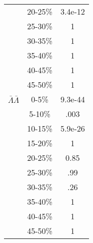 \begin{table}
\begin{minipage}{18pc}
\begin{center}
\begin{tabular}{| c | c | c |}
   & 20-25\% & 3.4e-12 \\
   & 25-30\% & 1 \\
   & 30-35\% & 1 \\
   & 35-40\% & 1 \\
   & 40-45\% & 1 \\
   & 45-50\% & 1 \\
   \hline
  $\bar{\Lambda}\bar{\Lambda}$ &  0-5\% & 9.3e-44 \\
   & 5-10\% & .003 \\
   & 10-15\% & 5.9e-26 \\
   & 15-20\% & 1 \\
   & 20-25\% & 0.85 \\
   & 25-30\% & .99 \\
   & 30-35\% & .26 \\
   & 35-40\% & 1 \\
   & 40-45\% & 1 \\
   & 45-50\% & 1 \\
   \hline
\end{tabular}
\end{center}
\end{minipage}
\end{table}

